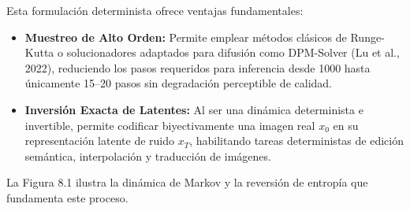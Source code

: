 Esta formulación determinista ofrece ventajas fundamentales:
\begin{itemize}
    \item \textbf{Muestreo de Alto Orden:} Permite emplear métodos clásicos de Runge-Kutta o solucionadores adaptados para difusión como DPM-Solver (Lu et al., 2022), reduciendo los pasos requeridos para inferencia desde 1000 hasta únicamente 15--20 pasos sin degradación perceptible de calidad.
    \item \textbf{Inversión Exacta de Latentes:} Al ser una dinámica determinista e invertible, permite codificar biyectivamente una imagen real $x_0$ en su representación latente de ruido $x_T$, habilitando tareas deterministas de edición semántica, interpolación y traducción de imágenes.
\end{itemize}

La Figura 8.1 ilustra la dinámica de Markov y la reversión de entropía que fundamenta este proceso.


